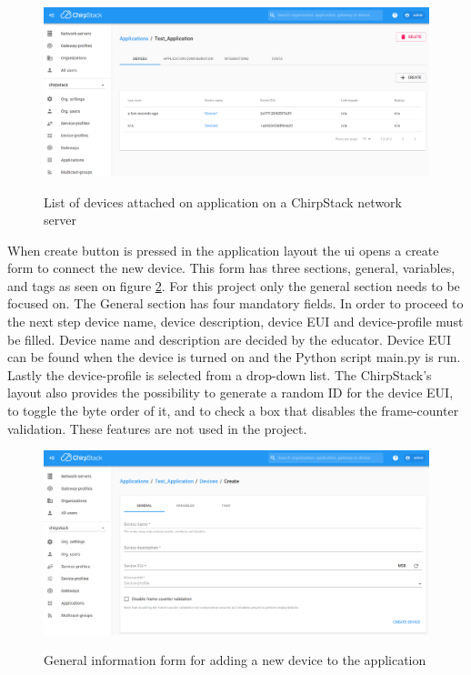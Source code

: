 \begin{figure}[ht]
  \centering
  {\includegraphics[width=\textwidth]{illustration/ChirpStack_application.png}}
  \caption{List of devices attached on application on a ChirpStack network server}
  \label{fig:ChirpStack_application}
\end{figure}

When create button is pressed in the application layout the \gls{ui} opens a create form to connect the new device.
This form has three sections, general, variables, and tags as seen on figure \ref{fig:ChirpStack_new_device}.
For this project only the general section needs to be focused on.
The General section has four mandatory fields.
In order to proceed to the next step device name, device description, device EUI and device-profile must be filled.
Device name and description are decided by the educator.
Device EUI can be found when the device is turned on and the Python script main.py is run.
Lastly the device-profile is selected from a drop-down list.
The ChirpStack's layout also provides the possibility to generate a random ID for the device EUI, to toggle the byte order of it, and to check a box that disables the frame-counter validation.
These features are not used in the project.

\begin{figure}[ht]
  \centering
  {\includegraphics[width=\textwidth]{illustration/ChirpStack_new_device.png}}
  \caption{General information form for adding a new device to the application}
  \label{fig:ChirpStack_new_device}
\end{figure}

